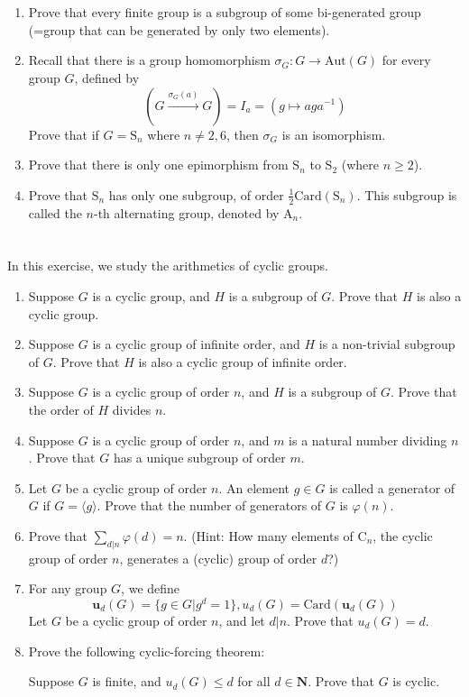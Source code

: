 \documentclass{report}
\begin{document}
\section{}
\begin{enumerate}
\item Prove that every finite group is a subgroup of some bi-generated group (=group that can be generated by only two elements).
\item
Recall that there is a group homomorphism $\sigma_G: G \rightarrow \text{Aut}(G)$ for every group $G$, defined by
\[\left(G \xrightarrow{\sigma_G (a)} G \right)= I_a = \left( g \mapsto aga^{-1} \right)\]
Prove that if $G = \text{S}_n$ where $n \neq 2,6$, then $\sigma_G$ is an isomorphism.
\item Prove that there is only one epimorphism from $\text{S}_n$ to $\text{S}_2$ (where $n \ge 2$).
\item Prove that $\text{S}_n$ has only one subgroup, of order $\frac{1}{2}\text{Card}(\text{S}_n)$. This subgroup is called the $n$-th alternating group, denoted by $\text{A}_n$.
\end{enumerate}
\section{}
In this exercise, we study the arithmetics of cyclic groups.
\begin{enumerate}
\item Suppose $G$ is a cyclic group, and $H$ is a subgroup of $G$. Prove that $H$ is also a cyclic group.
\item Suppose $G$ is a cyclic group of infinite order, and $H$ is a non-trivial subgroup of $G$. Prove that $H$ is also a cyclic group of infinite order.
\item Suppose $G$ is a cyclic group of order $n$, and $H$ is a subgroup of $G$. Prove that the order of $H$ divides $n$.
\item Suppose $G$ is a cyclic group of order $n$, and $m$ is a natural number dividing $n$. Prove that $G$ has a unique subgroup of order $m$.
\item Let $G$ be a cyclic group of order $n$. An element $g \in G$ is called a generator of $G$ if $G = \langle g \rangle$. Prove that the number of generators of $G$ is $\varphi(n)$.
\item Prove that $\sum_{d|n}\varphi(d) = n$. (Hint: How many elements of $\text{C}_n$, the cyclic group of order $n$, generates a (cyclic) group of order $d$?)
\item For any group $G$, we define
\[\mathbf{u}_d(G) = \{g \in G| g^d = 1\}, u_d(G) = \text{Card}(\mathbf{u}_d(G))\]
Let $G$ be a cyclic group of order $n$, and let $d|n$. Prove that $u_d(G) = d$.
\item
Prove the following cyclic-forcing theorem:

Suppose $G$ is finite, and $u_d(G) \le d$ for all $d \in \mathbf{N}$. Prove that $G$ is cyclic.
\end{enumerate}
\end{document}
